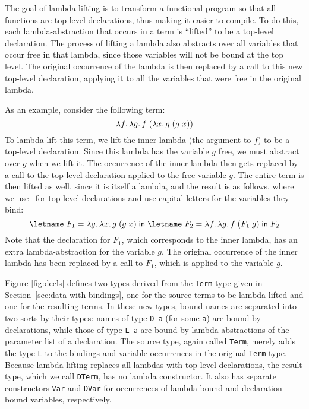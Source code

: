 \documentclass[natbib]{sigplanconf}
\begin{document}
The goal of lambda-lifting is to transform a functional program so
that all functions are top-level declarations, thus making it easier
to compile. To do this, each lambda-abstraction that occurs in a term
is ``lifted'' to be a top-level declaration. The process of lifting a
lambda also abstracts over all variables that occur free in that
lambda, since those variables will not be bound at the top level. The
original occurrence of the lambda is then replaced by a call to this
new top-level declaration, applying it to all the variables that were
free in the original lambda.

As an example, consider the following term:
\[
\lambda f.\,\lambda g.\,f\;(\lambda x.\,g\;(g\;x))
\]
To lambda-lift this term, we lift the inner lambda (the argument to
$f$) to be a top-level declaration. Since this lambda has the variable
$g$ free, we must abstract over $g$ when we lift it. The occurrence
of the inner lambda then gets replaced by a call to the top-level
declaration applied to the free variable $g$. The entire term is
then lifted as well, since it is itself a lambda, and the result
is as follows, where we use \ for top-level declarations
and use capital letters for the variables they bind:
\[
\lete{F_1}{\lamabsnot{g}{\lamabsnot{x}{g\;(g\;x)}}}{
\lete{F_2}{\lamabsnot{f}{\lamabsnot{g}{f\;(F_1\;g)}}}{
  F_2
}}
\]
Note that the declaration for $F_1$, which corresponds to the inner
lambda, has an extra lambda-abstraction for the variable $g$. The
original occurrence of the inner lambda has been replaced by a call to
$F_1$, which is applied to the variable $g$.


Figure \ref{fig:decls} defines two types derived from the
\lstinline{Term} type given in Section~\ref{sec:data-with-bindings},
one for the source terms to be lambda-lifted and one for the resulting
terms. In these new types, bound names are separated into two sorts by
their types: names of type \lstinline{D a} (for some \lstinline{a})
are bound by declarations, while those of type \lstinline{L a} are
bound by lambda-abstractions of the parameter list of a
declaration. The source type, again called \lstinline{Term}, merely
adds the type \lstinline{L} to the bindings and variable occurrences
in the original \lstinline{Term} type. Because lambda-lifting replaces
all lambdas with top-level declarations, the result type, which we
call \lstinline{DTerm}, has no lambda constructor. It also has
separate constructors \lstinline{Var} and \lstinline{DVar} for
occurrences of lambda-bound and declaration-bound variables,
respectively.
\end{document}
